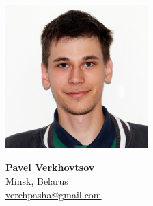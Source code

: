 \documentclass[margin, 10pt]{Stylesheet}
\begin{document}
\noindent\begin{minipage}{0.4\textwidth}%
\hspace*{-1.2cm}\includegraphics[width=5.5cm]{Pavel_Verkhovtsov.JPG}
\end{minipage}%
\hfill%
\begin{minipage}{0.6\textwidth}
{\large\bf Pavel Verkhovtsov}\\
Minsk, Belarus\\
\href{mailto:verchpasha@gmail.com}{verchpasha@gmail.com}\\
\end{minipage}
\end{document}

